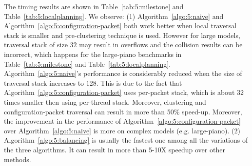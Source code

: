 \begin{table}[htb]
\begin{center}
\end{center}
\caption[Comparison of different CPU-based and GPU-based algorithms in the local planning component of PRM motion planner]{Comparison of different algorithms in local planning (timing in milliseconds). 32 and 128 are the
different sizes used for the traversal stack; C and no-C means using pre-clustering and not using pre-clustering, respectively; timing of Algorithm~\ref{algo:5:balancing} includes two parts: traversal part and balancing part.}\label{tab:5:localplanning}
\end{table}

The timing results are shown in Table~\ref{tab:5:milestone} and Table~\ref{tab:5:localplanning}. We observe: (1) Algorithm~\ref{algo:5:naive} and Algorithm~\ref{algo:5:configuration-packet} both work better when local traversal stack is smaller and
pre-clustering technique is used. However for large models, traversal stack of size $32$ may result in overflows and the
collision results can be incorrect, which happens for the large-piano benchmarks in Table~\ref{tab:5:milestone} and Table~\ref{tab:5:localplanning}. Algorithm~\ref{algo:5:naive}'s performance is considerably reduced when the size of traversal stack
increases to $128$. This is due to the fact that Algorithm~\ref{algo:5:configuration-packet} uses per-packet stack,
which is about $32$ times smaller then using per-thread stack. Moreover, clustering and  configuration-packet traversal
can result in more than 50\% speed-up. Moreover, the improvement in the performance of
Algorithm~\ref{algo:5:configuration-packet} over Algorithm~\ref{algo:5:naive} is more on complex models (e.g. large-piano).
(2) Algorithm~\ref{algo:5:balancing} is usually the fastest one among all the variations of the three algorithms.
It can result in more than 5-10X speedup over other methods.

